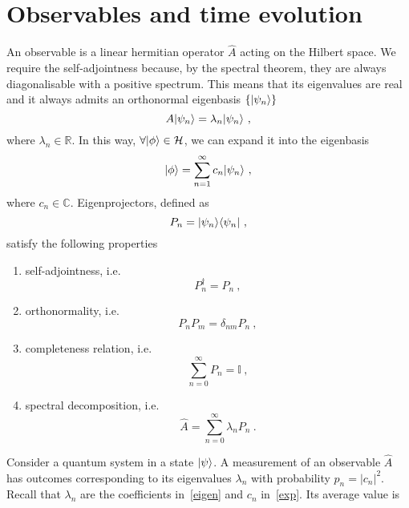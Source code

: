 \section{Observables and time evolution}

    An observable is a linear hermitian operator $\hat A$ acting on the Hilbert space. We require the self-adjointness because, by the spectral theorem, they are always diagonalisable with a positive spectrum. This means that its eigenvalues are real and it always admits an orthonormal eigenbasis $\{\vert\psi_n\rangle\}$
    \begin{equation}\label{eigen}
        A \vert\psi_n\rangle = \lambda_n \vert\psi_n\rangle ~,
    \end{equation}
    where $\lambda_n \in \mathbb R$. In this way, $\forall \vert\phi\rangle \in \mathcal H$, we can expand it into the eigenbasis 
    \begin{equation}\label{exp}
        \vert\phi\rangle = \sum_{n=1}^{\infty} c_n \vert\psi_n\rangle ~,
    \end{equation}
    where $c_n \in \mathbb C$.
    Eigenprojectors, defined as 
    \begin{equation*}
        P_n = \vert\psi_n\rangle \langle\psi_n\vert ~,
    \end{equation*}
    satisfy the following properties 
    \begin{enumerate}
        \item self-adjointness, i.e.
            \begin{equation*}
                P_n^\dagger = P_n ~,
            \end{equation*}
        \item orthonormality, i.e.
            \begin{equation*}
                P_n P_m = \delta_{nm} P_n ~,
            \end{equation*}
        \item completeness relation, i.e.
            \begin{equation}\label{compl}
                \sum_{n = 0}^{\infty} P_n = \mathbb I~,
            \end{equation}
        \item spectral decomposition, i.e.
            \begin{equation}\label{spec}
                \hat A = \sum_{n=0}^{\infty} \lambda_n P_n ~.
            \end{equation}
    \end{enumerate}
    Consider a quantum system in a state $\vert\psi\rangle$. A measurement of an observable $\hat A$ has outcomes corresponding to its eigenvalues $\lambda_n$ with probability $p_n = |c_n|^2$. Recall that $\lambda_n$ are the coefficients in~\eqref{eigen} and $c_n$ in~\eqref{exp}. Its average value is 
